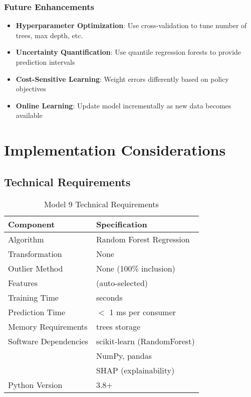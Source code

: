\subsubsection{Future Enhancements}

\begin{itemize}
    \item \textbf{Hyperparameter Optimization}: Use cross-validation to tune number of trees, max depth, etc.
    \item \textbf{Uncertainty Quantification}: Use quantile regression forests to provide prediction intervals
    \item \textbf{Cost-Sensitive Learning}: Weight errors differently based on policy objectives
    \item \textbf{Online Learning}: Update model incrementally as new data becomes available
\end{itemize}


\section{Implementation Considerations}

\subsection{Technical Requirements}

\begin{table}[ht]
\centering
\caption{Model 9 Technical Requirements}
\begin{tabular}{ll}
\toprule
\textbf{Component} & \textbf{Specification} \\
\midrule
Algorithm & Random Forest Regression \\
Transformation & None \\
Outlier Method & None (100\% inclusion) \\
Features & \ModelNineNumFeatures{} (auto-selected) \\
Training Time & \ModelNineTrainingTime{} seconds \\
Prediction Time & $<$ 1 ms per consumer \\
Memory Requirements & \ModelNineNTrees{} trees storage \\
\midrule
Software Dependencies & scikit-learn (RandomForest) \\
& NumPy, pandas \\
& SHAP (explainability) \\
Python Version & 3.8+ \\
\bottomrule
\end{tabular}
\end{table}


